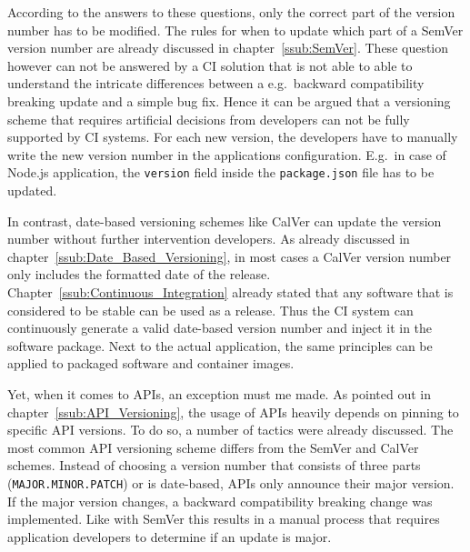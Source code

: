 According to the answers to these questions, only the correct part of the
version number has to be modified. The rules for when to update which part of a
SemVer version number are already discussed in chapter~\ref{ssub:SemVer}. These
question however can not be answered by a \ac{CI} solution that is not able to
able to understand the intricate differences between a e.g.\ backward
compatibility breaking update and a simple bug fix. Hence it can be argued that
a versioning scheme that requires artificial decisions from developers can not
be fully supported by \ac{CI} systems. For each new version, the developers
have to manually write the new version number in the applications
configuration. E.g.\ in case of Node.js application, the \texttt{version} field
inside the \texttt{package.json} file has to be updated.

In contrast, date-based versioning schemes like CalVer can update the version
number without further intervention developers. As already discussed in
chapter~\ref{ssub:Date_Based_Versioning}, in most cases a CalVer version number
only includes the formatted date of the release.
Chapter~\ref{ssub:Continuous_Integration} already stated that any software that
is considered to be stable can be used as a release. Thus the \ac{CI} system
can continuously generate a valid date-based version number and inject it in
the software package. Next to the actual application, the same principles can
be applied to packaged software and container images.

Yet, when it comes to \acp{API}, an exception must me made. As pointed out in
chapter~\ref{ssub:API_Versioning}, the usage of \acp{API} heavily depends on
pinning to specific \ac{API} versions. To do so, a number of tactics were
already discussed. The most common \ac{API} versioning scheme differs from the
SemVer and CalVer schemes. Instead of choosing a version number that consists
of three parts (\texttt{MAJOR.MINOR.PATCH}) or is date-based, \acp{API} only
announce their major version. If the major version changes, a backward
compatibility breaking change was implemented. Like with SemVer this results in
a manual process that requires application developers to determine if an update
is major.


